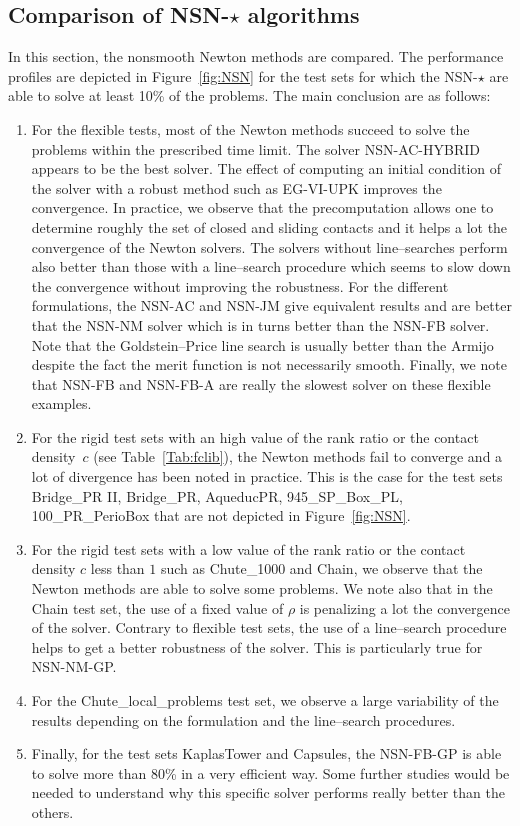 \subsection{Comparison of {\sf NSN-$\star$} algorithms}

In this section,  the nonsmooth Newton methods  are compared.  The performance profiles are depicted in Figure~\ref{fig:NSN} for the test sets for which the {\sf NSN-$\star$} are able to solve at least 10\% of the problems. The main conclusion are as follows:
\begin{enumerate}
\item For the flexible tests, most of the Newton methods succeed to solve the problems within the prescribed time limit. The solver {\sf NSN-AC-HYBRID} appears to be the best solver.  The effect of computing an initial condition of the solver with a robust method such as {\sf EG-VI-UPK}  improves the convergence. In practice, we observe that the precomputation allows one to determine roughly the set of closed and sliding contacts and it helps a lot the convergence of the Newton solvers. The solvers without line--searches perform also better than those with a line--search procedure which  seems to slow down the convergence without improving the robustness.  For the different formulations, the {\sf NSN-AC} and {\sf NSN-JM} give equivalent results and are better that the {\sf NSN-NM} solver which is in turns better than the {\sf NSN-FB} solver. Note that the Goldstein--Price line search is usually better than the Armijo despite the fact the merit function is not necessarily smooth. Finally, we note that  {\sf NSN-FB}  and {\sf NSN-FB-A} are really the slowest solver on these flexible examples.
\item For the rigid test sets with an high value of the rank ratio or the contact density~$c$ (see Table~\ref{Tab:fclib}), the Newton methods fail to converge and a lot of divergence has been noted in practice. This is the case for the test sets Bridge\_PR II, Bridge\_PR, AqueducPR, 945\_SP\_Box\_PL, 100\_PR\_PerioBox that are not depicted in Figure~\ref{fig:NSN}.
\item For the rigid test sets with a low value of the rank ratio or the contact density $c$ less than $1$ such as Chute\_1000 and Chain, we observe that the Newton methods are able to solve some problems. We note also that in the Chain test set, the use of a fixed value of $\rho$ is penalizing a lot the convergence of the solver. Contrary to flexible test sets, the use of a line--search procedure helps  to get a better robustness  of the solver. This is particularly true for {\sf NSN-NM-GP}.
\item For the Chute\_local\_problems test set, we observe a large variability of the results depending on the formulation and the line--search procedures.
\item Finally, for the test sets KaplasTower and Capsules, the {\sf NSN-FB-GP} is able to solve more than 80\% in a very efficient way. Some further studies would be needed to understand why this specific solver performs really better than the others.
\end{enumerate}
